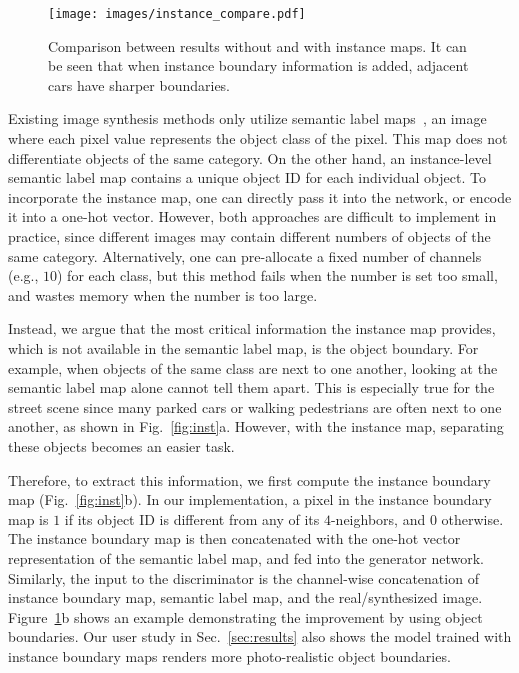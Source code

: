 \documentclass[10pt,twocolumn,letterpaper]{article}
\newcommand{\reffig}[1]{Fig.~\ref{fig:#1}}
\newcommand{\refsec}[1]{Sec.~\ref{sec:#1}}
\newcommand{\lblfig}[1]{\label{fig:#1}}
\begin{document}
\begin{figure}
  \centering
  \texttt{[image: images/instance\_compare.pdf]}   
  \caption{Comparison between results without and with instance maps. It can be seen that when instance boundary information is added, adjacent cars have sharper boundaries.}
  \lblfig{inst_compare}
\end{figure}

Existing image synthesis methods only utilize semantic label maps~\cite{isola2016image,karacan2016learning,chen2017photographic}, an image where each pixel value represents the object class of the pixel. This map does not differentiate objects of the same category. On the other hand, an instance-level semantic label map contains a unique object ID for each individual object. 
To incorporate the instance map, one can directly pass it into the network, or encode it into a one-hot vector. However, both approaches are difficult to implement in practice, since different images may contain different numbers of objects of the same category. Alternatively, one can pre-allocate a fixed number of channels (e.g., $10$) for each class, but this method fails when the number is set too small, and wastes memory when the number is too large.

Instead, we argue that the most critical information the instance map provides, which is not available in the semantic label map, is the object boundary. 
For example, when objects of the same class are next to one another, looking at the semantic label map alone cannot tell them apart. This is especially true for the street scene since many parked cars or walking pedestrians are often next to one another, as shown in \reffig{inst}a. However, with the instance map, separating these objects becomes an easier task.

Therefore, to extract this information, we first compute the instance boundary map (\reffig{inst}b). In our implementation, a pixel in the instance boundary map is $1$ if its object ID is different from any of its $4$-neighbors, and $0$ otherwise. 
The instance boundary map is then concatenated with the one-hot vector representation of the semantic label map, and fed into the generator network. 
Similarly, the input to the discriminator is the channel-wise concatenation of instance boundary map, semantic label map, and the real/synthesized image. Figure~\ref{fig:inst_compare}b shows an example demonstrating the improvement by using object boundaries. 
Our user study in \refsec{results} also shows the model trained with instance boundary maps renders more photo-realistic object boundaries.
\end{document}
